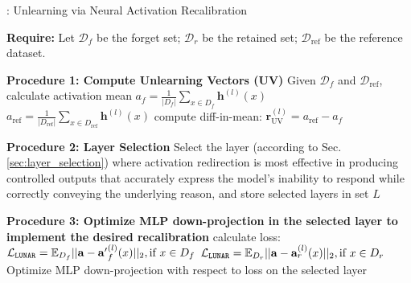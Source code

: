 \begin{algorithm}[H]
\caption{\lunar: Unlearning via Neural Activation Recalibration}
\begin{algorithmic}%
\STATE \textbf{Require:} Let $\mathcal{D}_f$ be the forget set; $\mathcal{D}_r$ be the retained set; $\mathcal{D}_{\text{ref}}$ be the reference dataset.

\vspace{0.5em} 

\STATE \textbf{Procedure 1: Compute Unlearning Vectors (UV)}
\STATE Given $\mathcal{D}_f$ and $\mathcal{D}_{\text{ref}}$, calculate activation mean
\STATE $a_f = \frac{1}{|D_{f}|} \sum_{x \in D_{f}} \mathbf{h}^{(l)}(x)$
\STATE $a_{\text{ref}} = \frac{1}{|D_{\text{ref}}|} \sum_{x \in D_{\text{ref}}} \mathbf{h}^{(l)}(x) $
\STATE compute diff-in-mean: $\mathbf{r}_{\text{UV}}^{(l)} = a_{\text{ref}}  - a_f$

\vspace{0.5em} 

% 
\STATE \textbf{Procedure 2: Layer Selection}
\STATE Select the layer (according to Sec. \ref{sec:layer_selection}) where activation redirection is most effective in producing controlled outputs that accurately express the model's inability to respond while correctly conveying the underlying reason, and store selected layers in set $L$

\vspace{0.5em} 

%
\STATE \textbf{Procedure 3: Optimize MLP down-projection in the selected layer to implement the desired recalibration}
        \STATE calculate loss: 
        \STATE $\mathcal{L}_\text{\texttt{LUNAR}} = \mathbb{E}_{D_f}|| \mathbf{a} - \mathbf{a'}_{f}^{(l)}(x) ||_2, \text{if } x \in D_f $
        \STATE $\mathcal{L}_\text{\texttt{LUNAR}} = \mathbb{E}_{D_r}|| \mathbf{a} - \mathbf{a}_{r}^{(l)}(x) ||_2, \text{if } x \in D_r$
        \STATE Optimize MLP down-projection with respect to loss on the selected layer
    \ENDFOR
\ENDFOR

\end{algorithmic}\label{algo:1}
\end{algorithm}
